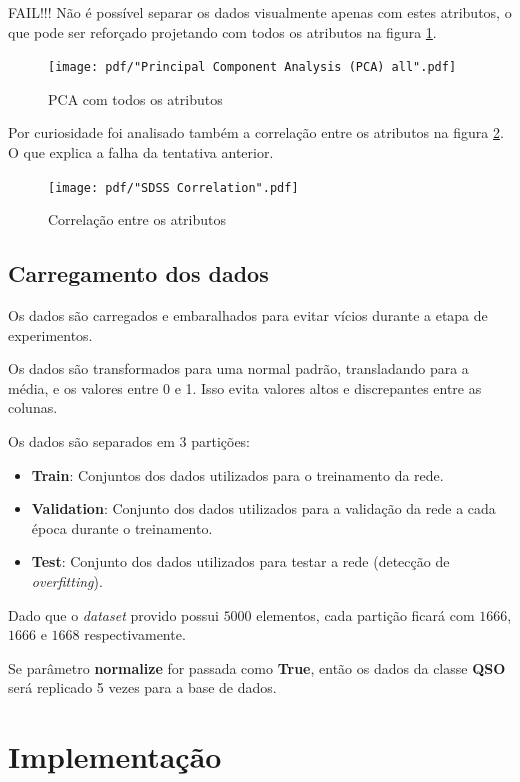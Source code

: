FAIL!!! Não é possível separar os dados visualmente apenas com estes atributos, o que pode ser reforçado
projetando com todos os atributos na figura \ref{fig:pcaprojall}.

\begin{figure}[H]
  \centering
  \texttt{[image: pdf/"Principal Component Analysis (PCA) all".pdf]}
  \caption{PCA com todos os atributos}
  \label{fig:pcaprojall}
\end{figure}

Por curiosidade foi analisado também a correlação entre os atributos na figura \ref{fig:corrdata}. O que explica a falha da tentativa anterior.

\begin{figure}[H]
  \centering
  \texttt{[image: pdf/"SDSS Correlation".pdf]}
  \caption{Correlação entre os atributos}
  \label{fig:corrdata}
\end{figure}

\subsection{Carregamento dos dados}

Os dados são carregados e embaralhados para evitar vícios durante a etapa de experimentos.

Os dados são transformados para uma normal padrão, transladando para a média, e os valores entre 0 e 1. Isso evita valores altos e discrepantes entre as colunas.

Os dados são separados em 3 partições:

\begin{itemize}
    \item \textbf{Train}: Conjuntos dos dados utilizados para o treinamento da rede.
    \item \textbf{Validation}: Conjunto dos dados utilizados para a validação da rede a cada época durante o treinamento.
    \item \textbf{Test}: Conjunto dos dados utilizados para testar a rede (detecção de \textit{overfitting}).
\end{itemize}

Dado que o \textit{dataset} provido possui $5000$ elementos, cada partição ficará com $1666$, $1666$ e $1668$ respectivamente.

Se parâmetro \textbf{normalize} for passada como \textbf{True}, então os dados da classe \textbf{QSO} será replicado 5 vezes para a base de dados.

\section{Implementação}

